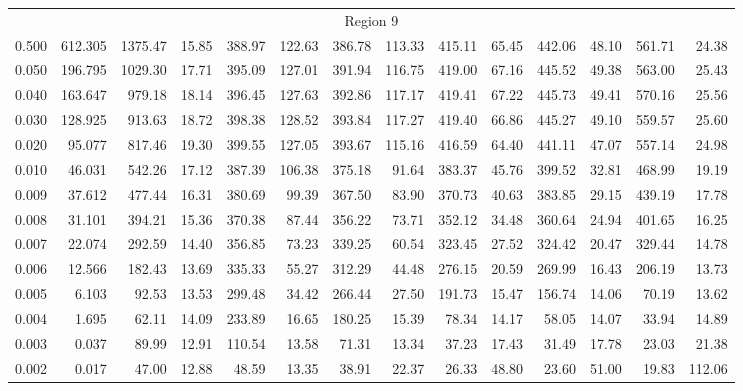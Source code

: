 \begin{tabular}{@{}lrrrrrrrrrrrrr@{}}
\midrule
\multicolumn{14}{c}{Region 9} \\
\cmidrule{1-14}
0.500 & 612.305 & 1375.47 & 15.85 & 388.97 & 122.63 & 386.78 & 113.33 & 415.11 & 65.45 & 442.06 & 48.10 & 561.71 & 24.38 \\
0.050 & 196.795 & 1029.30 & 17.71 & 395.09 & 127.01 & 391.94 & 116.75 & 419.00 & 67.16 & 445.52 & 49.38 & 563.00 & 25.43 \\
0.040 & 163.647 & 979.18 & 18.14 & 396.45 & 127.63 & 392.86 & 117.17 & 419.41 & 67.22 & 445.73 & 49.41 & 570.16 & 25.56 \\
0.030 & 128.925 & 913.63 & 18.72 & 398.38 & 128.52 & 393.84 & 117.27 & 419.40 & 66.86 & 445.27 & 49.10 & 559.57 & 25.60 \\
0.020 & 95.077 & 817.46 & 19.30 & 399.55 & 127.05 & 393.67 & 115.16 & 416.59 & 64.40 & 441.11 & 47.07 & 557.14 & 24.98 \\
0.010 & 46.031 & 542.26 & 17.12 & 387.39 & 106.38 & 375.18 & 91.64 & 383.37 & 45.76 & 399.52 & 32.81 & 468.99 & 19.19 \\
0.009 & 37.612 & 477.44 & 16.31 & 380.69 & 99.39 & 367.50 & 83.90 & 370.73 & 40.63 & 383.85 & 29.15 & 439.19 & 17.78 \\
0.008 & 31.101 & 394.21 & 15.36 & 370.38 & 87.44 & 356.22 & 73.71 & 352.12 & 34.48 & 360.64 & 24.94 & 401.65 & 16.25 \\
0.007 & 22.074 & 292.59 & 14.40 & 356.85 & 73.23 & 339.25 & 60.54 & 323.45 & 27.52 & 324.42 & 20.47 & 329.44 & 14.78 \\
0.006 & 12.566 & 182.43 & 13.69 & 335.33 & 55.27 & 312.29 & 44.48 & 276.15 & 20.59 & 269.99 & 16.43 & 206.19 & 13.73 \\
0.005 & 6.103 & 92.53 & 13.53 & 299.48 & 34.42 & 266.44 & 27.50 & 191.73 & 15.47 & 156.74 & 14.06 & 70.19 & 13.62 \\
0.004 & 1.695 & 62.11 & 14.09 & 233.89 & 16.65 & 180.25 & 15.39 & 78.34 & 14.17 & 58.05 & 14.07 & 33.94 & 14.89 \\
0.003 & 0.037 & 89.99 & 12.91 & 110.54 & 13.58 & 71.31 & 13.34 & 37.23 & 17.43 & 31.49 & 17.78 & 23.03 & 21.38 \\
0.002 & 0.017 & 47.00 & 12.88 & 48.59 & 13.35 & 38.91 & 22.37 & 26.33 & 48.80 & 23.60 & 51.00 & 19.83 & 112.06 \\


\end{tabular}
